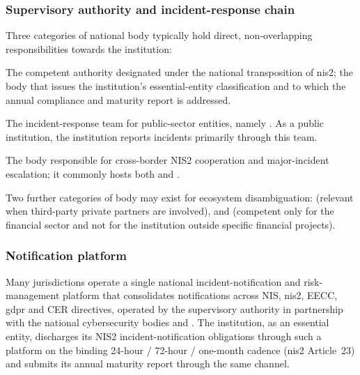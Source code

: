 \subsubsection{Supervisory authority and incident-response chain}

Three categories of national body typically hold direct,
non-overlapping responsibilities towards the institution:

\begin{description}[nosep]
    \item[The NIS2 supervisory authority.] The competent authority
    designated under the national transposition of
    \gls{nis2}; the body that issues the institution's
    essential-entity classification and to which the annual compliance
    and maturity report is addressed.
    \item[The national / governmental \gls{csirt}.] The
    incident-response team for public-sector entities, namely
    . As a public
    institution, the institution reports incidents primarily through
    this team.
    \item[The national single point of contact.] The body responsible
    for cross-border NIS2 cooperation and major-incident escalation;
    it commonly hosts both  and .
\end{description}

\noindent Two further categories of body may exist for ecosystem
disambiguation:  (relevant when third-party private
partners are involved), and  (competent
only for the financial sector and not for the institution outside
specific financial projects).

\subsubsection{Notification platform}

Many jurisdictions operate a single national incident-notification and
risk-management platform that consolidates notifications across NIS,
\gls{nis2}, EECC, \gls{gdpr} and CER directives, operated by the
supervisory authority in partnership with the national cybersecurity
bodies and . The institution,
as an essential entity, discharges its NIS2 incident-notification
obligations through such a platform on the binding 24-hour / 72-hour /
one-month cadence (\gls{nis2} Article~23) and submits its annual maturity
report through the same channel.

